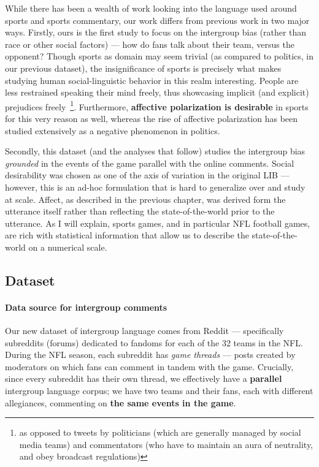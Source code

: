 While there has been a wealth of work looking into the language used around sports and sports commentary, our work differs from previous work in two major ways. Firstly, ours is the first study to focus on the intergroup bias (rather than race or other social factors) --- how do fans talk about their team, versus the opponent? Though sports as domain may seem trivial (as compared to politics, in our previous dataset), the insignificance of sports is precisely what makes studying human social-linguistic behavior in this realm interesting. People are less restrained speaking their mind freely, thus showcasing implicit (and explicit) prejudices freely~\footnote{as opposed to tweets by politicians (which are generally managed by social media teams) and commentators (who have to maintain an aura of neutrality, and obey broadcast regulations)}. Furthermore, \textbf{affective polarization is desirable} in sports for this very reason as well, whereas the rise of affective polarization has been studied extensively as a negative phenomenon in politics\citep{iyengar_origins_2019}.


Secondly, this dataset (and the analyses that follow) studies the intergroup bias \emph{grounded} in the events of the game parallel with the online comments. Social desirability was chosen as one of the axis of variation in the original LIB --- however, this is an ad-hoc formulation that is hard to generalize over and study at scale. Affect, as described in the previous chapter, was derived form the utterance itself rather than reflecting the state-of-the-world prior to the utterance. As I will explain, sports games, and in particular NFL football games, are rich with statistical information that allow us to describe the state-of-the-world on a numerical scale.

\subsection{Dataset} 

\paragraph{Data source for intergroup comments} Our new dataset of intergroup language comes from Reddit --- specifically subreddits (forums) dedicated to fandoms for each of the 32 teams in the NFL. During the NFL season, each subreddit has \emph{game threads} --- posts created by moderators on which fans can comment in tandem with the game. Crucially, since every subreddit has their own thread, we effectively have a \textbf{parallel} intergroup language corpus; we have two teams and their fans, each with different allegiances, commenting on \textbf{the same events in the game}. 

